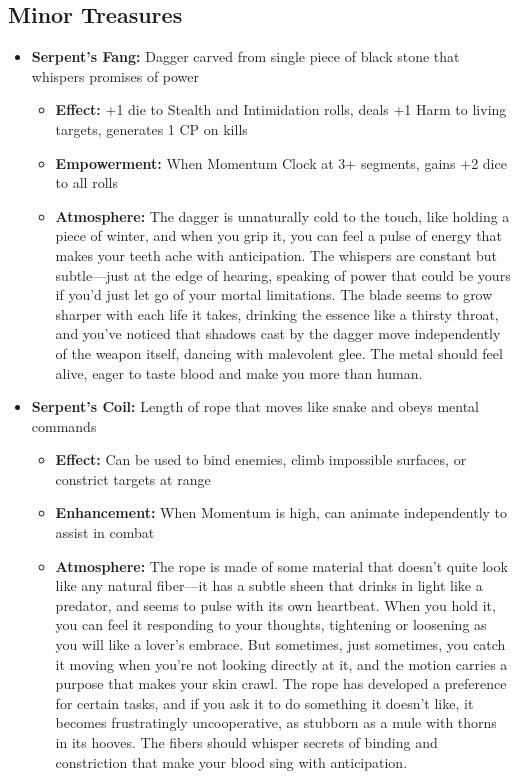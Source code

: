 \documentclass[11pt]{article}
\begin{document}
\subsection{Minor Treasures}
\begin{itemize}
\item \textbf{Serpent's Fang:} Dagger carved from single piece of black stone that whispers promises of power
  \begin{itemize}
  \item \textbf{Effect:} +1 die to Stealth and Intimidation rolls, deals +1 Harm to living targets, generates 1 CP on kills
  \item \textbf{Empowerment:} When Momentum Clock at 3+ segments, gains +2 dice to all rolls
  \item \textbf{Atmosphere:} The dagger is unnaturally cold to the touch, like holding a piece of winter, and when you grip it, you can feel a pulse of energy that makes your teeth ache with anticipation. The whispers are constant but subtle—just at the edge of hearing, speaking of power that could be yours if you'd just let go of your mortal limitations. The blade seems to grow sharper with each life it takes, drinking the essence like a thirsty throat, and you've noticed that shadows cast by the dagger move independently of the weapon itself, dancing with malevolent glee. The metal should feel alive, eager to taste blood and make you more than human.
  \end{itemize}
\item \textbf{Serpent's Coil:} Length of rope that moves like snake and obeys mental commands
  \begin{itemize}
  \item \textbf{Effect:} Can be used to bind enemies, climb impossible surfaces, or constrict targets at range
  \item \textbf{Enhancement:} When Momentum is high, can animate independently to assist in combat
  \item \textbf{Atmosphere:} The rope is made of some material that doesn't quite look like any natural fiber—it has a subtle sheen that drinks in light like a predator, and seems to pulse with its own heartbeat. When you hold it, you can feel it responding to your thoughts, tightening or loosening as you will like a lover's embrace. But sometimes, just sometimes, you catch it moving when you're not looking directly at it, and the motion carries a purpose that makes your skin crawl. The rope has developed a preference for certain tasks, and if you ask it to do something it doesn't like, it becomes frustratingly uncooperative, as stubborn as a mule with thorns in its hooves. The fibers should whisper secrets of binding and constriction that make your blood sing with anticipation.
  \end{itemize}
\end{itemize}
\end{document}
